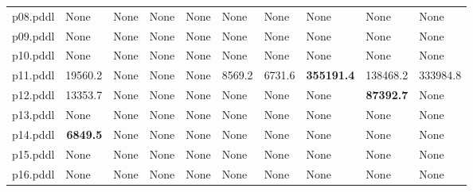 \documentclass{article}
\begin{document}
\begin{tabular}{@{}lrrrrrrrrr@{}}
p08.pddl & \multicolumn{1}{|l|}{None} & \multicolumn{1}{|l|}{None} & \multicolumn{1}{|l|}{None} & \multicolumn{1}{|l|}{None} & \multicolumn{1}{|l|}{None} & \multicolumn{1}{|l|}{None} & \multicolumn{1}{|l|}{None} & \multicolumn{1}{|l|}{None} & \multicolumn{1}{|l|}{None} \\
p09.pddl & \multicolumn{1}{|l|}{None} & \multicolumn{1}{|l|}{None} & \multicolumn{1}{|l|}{None} & \multicolumn{1}{|l|}{None} & \multicolumn{1}{|l|}{None} & \multicolumn{1}{|l|}{None} & \multicolumn{1}{|l|}{None} & \multicolumn{1}{|l|}{None} & \multicolumn{1}{|l|}{None} \\
p10.pddl & \multicolumn{1}{|l|}{None} & \multicolumn{1}{|l|}{None} & \multicolumn{1}{|l|}{None} & \multicolumn{1}{|l|}{None} & \multicolumn{1}{|l|}{None} & \multicolumn{1}{|l|}{None} & \multicolumn{1}{|l|}{None} & \multicolumn{1}{|l|}{None} & \multicolumn{1}{|l|}{None} \\
p11.pddl & 19560.2 & \multicolumn{1}{|l|}{None} & \multicolumn{1}{|l|}{None} & \multicolumn{1}{|l|}{None} & 8569.2 & 6731.6 & \textbf{355191.4} & 138468.2 & 333984.8 \\
p12.pddl & 13353.7 & \multicolumn{1}{|l|}{None} & \multicolumn{1}{|l|}{None} & \multicolumn{1}{|l|}{None} & \multicolumn{1}{|l|}{None} & \multicolumn{1}{|l|}{None} & \multicolumn{1}{|l|}{None} & \textbf{87392.7} & \multicolumn{1}{|l|}{None} \\
p13.pddl & \multicolumn{1}{|l|}{None} & \multicolumn{1}{|l|}{None} & \multicolumn{1}{|l|}{None} & \multicolumn{1}{|l|}{None} & \multicolumn{1}{|l|}{None} & \multicolumn{1}{|l|}{None} & \multicolumn{1}{|l|}{None} & \multicolumn{1}{|l|}{None} & \multicolumn{1}{|l|}{None} \\
p14.pddl & \textbf{6849.5} & \multicolumn{1}{|l|}{None} & \multicolumn{1}{|l|}{None} & \multicolumn{1}{|l|}{None} & \multicolumn{1}{|l|}{None} & \multicolumn{1}{|l|}{None} & \multicolumn{1}{|l|}{None} & \multicolumn{1}{|l|}{None} & \multicolumn{1}{|l|}{None} \\
p15.pddl & \multicolumn{1}{|l|}{None} & \multicolumn{1}{|l|}{None} & \multicolumn{1}{|l|}{None} & \multicolumn{1}{|l|}{None} & \multicolumn{1}{|l|}{None} & \multicolumn{1}{|l|}{None} & \multicolumn{1}{|l|}{None} & \multicolumn{1}{|l|}{None} & \multicolumn{1}{|l|}{None} \\
p16.pddl & \multicolumn{1}{|l|}{None} & \multicolumn{1}{|l|}{None} & \multicolumn{1}{|l|}{None} & \multicolumn{1}{|l|}{None} & \multicolumn{1}{|l|}{None} & \multicolumn{1}{|l|}{None} & \multicolumn{1}{|l|}{None} & \multicolumn{1}{|l|}{None} & \multicolumn{1}{|l|}{None} \\

\end{tabular}
\end{document}
